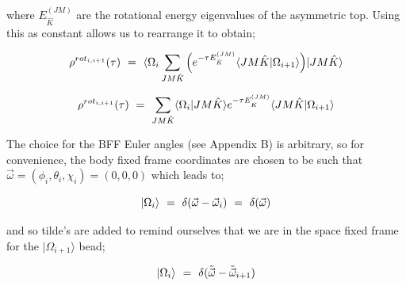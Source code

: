 \documentclass[11pt]{article}
\providecommand{\Tilde}{\tilde}
\begin{document}
where \begin{math} E_{\hat{K}}^{(JM)} \end{math} are the rotational energy eigenvalues of the asymmetric top. Using this as constant allows us to rearrange it to obtain;

\begin{equation}
    \rho^{rot_{i, i+1}} ( \tau ) \hspace{0.125cm} = \hspace{0.125cm} \langle \Omega_{i} \sum_{J M \hat{K}} \Big( e^{- \tau E_{\hat{K}}^{(JM)}}  \langle JM\hat{K} | \Omega_{i+1} \rangle  \Big) | JM\hat{K} \rangle 
\end{equation}

\begin{equation}
    \rho^{rot_{i, i+1}} ( \tau ) \hspace{0.125cm} = \hspace{0.125cm}  \sum_{J M \hat{K}} \langle \Omega_{i} | JM\hat{K} \rangle  e^{- \tau E_{\hat{K}}^{(JM)}} \langle JM\hat{K} | \Omega_{i+1} \rangle 
\end{equation}

The choice for the BFF Euler angles (see Appendix B) is arbitrary, so for convenience, the body fixed frame coordinates are chosen to be such that \begin{math} \vec{\omega} = ( \phi_i , \theta_{i} , \chi_i ) = ( 0 , 0 , 0 ) \end{math} which leads to; 

\begin{equation}
    | \Omega_{i} \rangle \hspace{0.125cm} = \hspace{0.125cm} \delta ( \vec{\omega} - \vec{\omega}_i ) \hspace{0.125cm} = \hspace{0.125cm} \delta ( \vec{\omega} )
\end{equation}

and so tilde's are added to remind ourselves that we are in the space fixed frame for the \begin{math} | \Omega_{i+1} \rangle \end{math} bead;

\begin{equation}
    | \Omega_{i} \rangle \hspace{0.125cm} = \hspace{0.125cm} \delta ( \Tilde{\vec{\omega}} - \Tilde{\vec{\omega}}_{i+1} )  
\end{equation}
\end{document}
